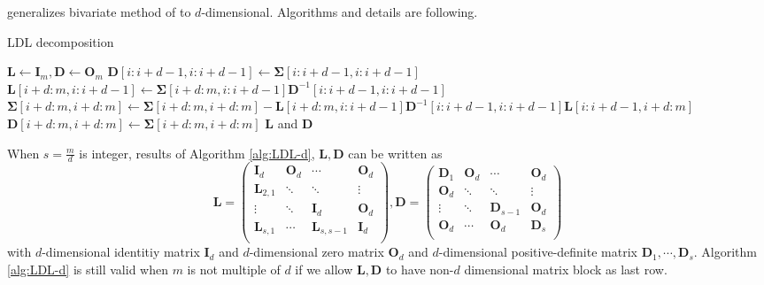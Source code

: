 \citet{cao2019hierarchical} generalizes bivariate method of \citet{trinh2015bivariate} to $d$-dimensional. Algorithms and details are following.
\begin{algorithm}[H]
	\caption{LDL decomposition}
	\begin{algorithmic}[1]
		\State $\mathbf{L} \leftarrow \mathbf{I}_m, \mathbf{D} \leftarrow \mathbf{O}_m$
		\State $\mathbf{D}[i:i+d-1,i:i+d-1] \leftarrow \mathbf{\Sigma}[i:i+d-1,i:i+d-1]$
		\State $\mathbf{L}[i+d:m,i:i+d-1] \leftarrow \mathbf{\Sigma}[i+d:m,i:i+d-1]\mathbf{D}^{-1}[i:i+d-1,i:i+d-1]$
		\State $\mathbf{\Sigma}[i+d:m,i+d:m]\leftarrow\mathbf{\Sigma}[i+d:m,i+d:m]-\mathbf{L}[i+d:m,i:i+d-1] \mathbf{D}^{-1}[i:i+d-1,i:i+d-1] \mathbf{L}[i:i+d-1,i+d:m]$
			\State $\mathbf{D}[i+d:m,i+d:m] \leftarrow \mathbf{\Sigma}[i+d:m,i+d:m]$
		\EndIf
		\EndFor
		\State\Return $\mathbf{L}$ and $\mathbf{D}$
		\EndProcedure
		
	\end{algorithmic}\label{alg:LDL-d}
\end{algorithm}
When $s=\frac{m}{d}$ is integer, results of Algorithm \ref{alg:LDL-d}, $\mathbf{L}, \mathbf{D}$ can be written as
$$
\mathbf{L} = \begin{pmatrix}
\mathbf{I}_d & \mathbf{O}_d & \cdots &\mathbf{O}_d\\
\mathbf{L}_{2,1} & \ddots & \ddots &\vdots\\
\vdots & \ddots & \mathbf{I}_d & \mathbf{O}_d\\
\mathbf{L}_{s,1} & \cdots & \mathbf{L}_{s,s-1} &\mathbf{I}_d\\
\end{pmatrix},
\mathbf{D} = \begin{pmatrix}
\mathbf{D}_1 & \mathbf{O}_d & \cdots &\mathbf{O}_d\\
\mathbf{O}_{d} & \ddots & \ddots &\vdots\\
\vdots & \ddots & \mathbf{D}_{s-1} & \mathbf{O}_d\\
\mathbf{O}_d & \cdots & \mathbf{O}_d &\mathbf{D}_s\\
\end{pmatrix}
$$
with $d$-dimensional identitiy matrix $\mathbf{I}_d$ and $d$-dimensional zero matrix $\mathbf{O}_d$ and $d$-dimensional positive-definite matrix $\mathbf{D}_1,\cdots,\mathbf{D}_s$. Algorithm \ref{alg:LDL-d} is still valid when $m$ is not multiple of $d$ if we allow $\mathbf{L},\mathbf{D}$ to have non-$d$ dimensional matrix block as last row.\\

